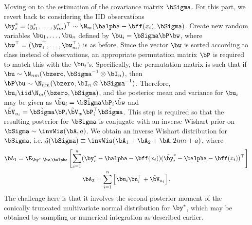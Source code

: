 Moving on to the estimation of the covariance matrix $\bSigma$.
For this part, we revert back to considering the IID observations $\by_i^* = (y_{i1}^*,\dots,y_{im}^*)^\top \sim \N_m(\balpha - \bff(x_i), \bSigma)$. 
Create new random variables $\bu_1,\dots,\bu_n$ defined by $\bu_i = \bSigma\bP\bw$, where $\bw^\top = (\bw_1^\top,\dots,\bw_m^\top)$ is as before.
Since the vector $\bw$ is sorted according to class instead of observations, an appropriate permutation matrix $\bP$ is required to match this with the $\bu_i$'s.
Specifically, the permutation matrix is such that if $\bu \sim \N_{nm}(\bzero, \bSigma^{-1} \otimes \bI_n)$, then $\bP\bu \sim \N_{nm}(\bzero, \bI_n \otimes\bSigma^{-1})$.
Therefore, $\bu_i \iid \N_m(\bzero, \bSigma)$, and the posterior mean and variance for $\bu_i$ may be given as $\tilde \bu_i = \tilde\bSigma\bP_i\tilde\bw$ and $\tilde\bV_{u_i} = \tilde\bSigma\bP_i\tilde\bV_w\bP_i^\top\tilde\bSigma \vphantom{\iid}$.
This step is required so that the resulting posterior for $\bSigma$ is conjugate with an inverse Wishart prior on $\bSigma \sim \invWis(\bA, a)$.
We obtain an inverse Wishart distribution for $\bSigma$, i.e. $\tilde q(\bSigma) \equiv \invWis(\bA_1 + \bA_2 + \bA, 2nm + a)$, where
\begin{align*}
  \begin{gathered}
  \bA_1 = \E_{\by^*,\bw,\balpha} \left[ \sum_{i=1}^n (\by^*_i - \balpha - \bff(x_i))(\tilde\by^*_i - \balpha - \bff(x_i))^\top \right]   \\
  \bA_2 = \sum_{i=1}^n \left[\bu_i\bu_i^\top + \tilde\bV_{u_i} \right].
  \end{gathered}
\end{align*}
The challenge here is that it involves the second posterior moment of the conically truncated multivariate normal distribution for $\by^*$, which may be obtained by sampling or numerical integration as described earlier.

